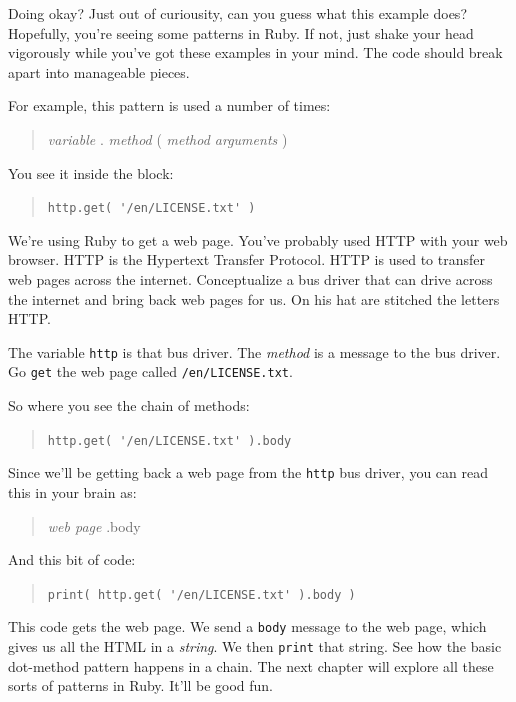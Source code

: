 \documentclass[10pt,twoside]{report}
\begin{document}
Doing okay?  Just out of curiousity, can you guess what this example
does?  Hopefully, you're seeing some patterns in Ruby.  If not, just
shake your head vigorously while you've got these examples in your
mind.  The code should break apart into manageable pieces.

For example, this pattern is used a number of times:

\begin{quote}
{\em variable} . {\em method} ( {\em method arguments} )\end{quote}


You see it inside the block:

\begin{quote}
\lstinline[breaklines=true]|http.get( '/en/LICENSE.txt' )|\end{quote}


We're using Ruby to get a web page.  You've probably used HTTP with
your web browser.  HTTP is the Hypertext Transfer Protocol.  HTTP is
used to transfer web pages across the internet.  Conceptualize a bus
driver that can drive across the internet and bring back web pages for
us.  On his hat are stitched the letters HTTP.

The variable \lstinline[breaklines=true]|http| is that bus driver.
The {\em method} is a message to the bus driver.  Go
\lstinline[breaklines=true]|get| the web page called
\lstinline[breaklines=true]|/en/LICENSE.txt|.

So where you see the chain of methods:

\begin{quote}
\lstinline[breaklines=true]|http.get( '/en/LICENSE.txt' ).body|\end{quote}


Since we'll be getting back a web page from the
\lstinline[breaklines=true]|http| bus driver, you can read this in
your brain as:

\begin{quote}
{\em web page} .body\end{quote}


And this bit of code:

\begin{quote}
\lstinline[breaklines=true]|print( http.get( '/en/LICENSE.txt' ).body )|\end{quote}


This code gets the web page.  We send a
\lstinline[breaklines=true]|body| message to the web page, which gives
us all the HTML in a {\em string}.  We then
\lstinline[breaklines=true]|print| that string.  See how the basic
dot-method pattern happens in a chain.  The next chapter will explore
all these sorts of patterns in Ruby.  It'll be good fun.
\end{document}
